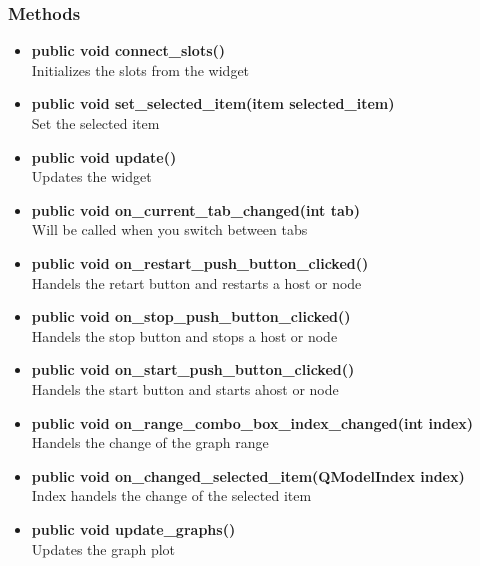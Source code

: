 \subsubsection{Methods}
\begin{itemize}
  \item \textbf{public void connect\_slots()}\\
  Initializes the slots from the widget
  \item \textbf{public void set\_selected\_item(item selected\_item)}\\
  Set the selected item
  \item \textbf{public void update()}\\
  Updates the widget
  \item \textbf{public void on\_current\_tab\_changed(int tab)}\\
  Will be called when you switch between tabs
  \item \textbf{public void on\_restart\_push\_button\_clicked()}\\
  Handels the retart button and restarts a host or node
  \item \textbf{public void on\_stop\_push\_button\_clicked()}\\
  Handels the stop button and stops a host or node
  \item \textbf{public void on\_start\_push\_button\_clicked()}\\
  Handels the start button and starts ahost or node
  \item \textbf{public void on\_range\_combo\_box\_index\_changed(int index)}\\
  Handels the change of the graph range
  \item \textbf{public void on\_changed\_selected\_item(QModelIndex index)}\\
  Index handels the change of the selected item
  \item \textbf{public void update\_graphs()}\\
  Updates the graph plot
\end{itemize}